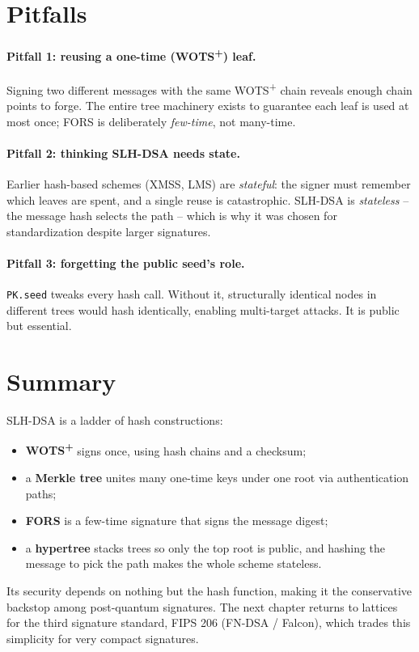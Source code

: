 \section{Pitfalls}

\paragraph{Pitfall 1: reusing a one-time (WOTS\textsuperscript{+}) leaf.}
Signing two different messages with the same WOTS\textsuperscript{+} chain reveals enough chain points to forge. The entire tree machinery exists to guarantee each leaf is used at most once; FORS is deliberately \emph{few-time}, not many-time.

\paragraph{Pitfall 2: thinking SLH-DSA needs state.}
Earlier hash-based schemes (XMSS, LMS) are \emph{stateful}: the signer must remember which leaves are spent, and a single reuse is catastrophic. SLH-DSA is \emph{stateless} -- the message hash selects the path -- which is why it was chosen for standardization despite larger signatures.

\paragraph{Pitfall 3: forgetting the public seed's role.}
\texttt{PK.seed} tweaks every hash call. Without it, structurally identical nodes in different trees would hash identically, enabling multi-target attacks. It is public but essential.

\section{Summary}

SLH-DSA is a ladder of hash constructions:

\begin{itemize}
  \item \textbf{WOTS\textsuperscript{+}} signs once, using hash chains and a checksum;
  \item a \textbf{Merkle tree} unites many one-time keys under one root via authentication paths;
  \item \textbf{FORS} is a few-time signature that signs the message digest;
  \item a \textbf{hypertree} stacks trees so only the top root is public, and hashing the message to pick the path makes the whole scheme stateless.
\end{itemize}

Its security depends on nothing but the hash function, making it the conservative backstop among post-quantum signatures. The next chapter returns to lattices for the third signature standard, FIPS 206 (FN-DSA / Falcon), which trades this simplicity for very compact signatures.
